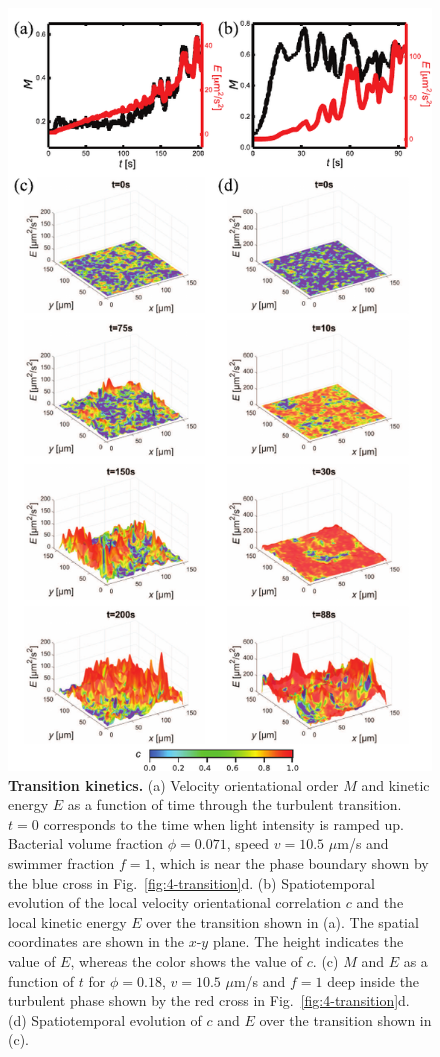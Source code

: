 \begin{figure}[!hp]
	\begin{center}
	\includegraphics[height=5.2 in]{Figs/4-Emergence/3.pdf}
	\end{center}
	\caption[Transition Kinetics]
	{
	\textbf{Transition kinetics.}
  (a) Velocity orientational order $M$ and kinetic energy $E$ as a function of time through the turbulent transition. $t = 0$ corresponds to the time when light intensity is ramped up. Bacterial volume fraction $\phi = 0.071$, speed $v = 10.5$ $\mu$m/s and swimmer fraction $f = 1$, which is near the phase boundary shown by the blue cross in Fig.~\ref{fig:4-transition}d.
  (b) Spatiotemporal evolution of the local velocity orientational correlation $c$ and the local kinetic energy $E$ over the transition shown in (a). The spatial coordinates are shown in the $x$-$y$ plane. The height indicates the value of $E$, whereas the color shows the value of $c$.
  (c) $M$ and $E$ as a function of $t$ for $\phi = 0.18$, $v = 10.5$ $\mu$m/s and $f = 1$ deep inside the turbulent phase shown by the red cross in Fig.~\ref{fig:4-transition}d.
  (d) Spatiotemporal evolution of $c$ and $E$ over the transition shown in (c).
	}
	\label{fig:4-kinetics}
\end{figure}



